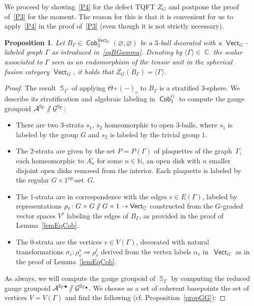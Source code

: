 \documentclass[10pt,a4paper]{amsart}
\DeclareMathOperator{\vect}{\mathsf{Vect}}
\DeclareMathOperator{\C}{\mathbb{C}}
\DeclareMathOperator{\Sp}{\mathbb{S}}
\DeclareMathOperator{\Cob}{\mathsf{Cob}}
\newcommand{\sslash}{\mathbin{/\mkern-6mu/}}
\numberwithin{equation}{section}
\newtheorem{Proposition}[Proposition]{Proposition}
\theoremstyle{definition}
\begin{document}
We proceed by showing~\ref{P4} for the defect TQFT $Z_G$ and postpone the proof of~\ref{P3} for the moment. The reason for this is that it is convenient for us to apply~\ref{P4} in the proof of~\ref{P3} (even though it is not strictly necessary).
\begin{Proposition}
\label{propDW4}
 Let $B_{\Gamma} \in \Cob_3^{\vect_G}(\varnothing, \varnothing)$ be a $3$-ball decorated with a $\vect_G$-labeled graph $\Gamma$ as introduced in~\eqref{eqBGamma}. Denoting by $\langle \Gamma \rangle \in \C$ the scalar associated to $\Gamma$ seen as an endomorphism of the tensor unit in the spherical fusion category $\vect_G$, it holds that $Z_G(B_{\Gamma}) = \langle \Gamma \rangle$.
\end{Proposition}
\begin{proof}
The result $\Sp_{\Gamma}$ of applying $\Theta \circ (-)_c$ to $B_{\Gamma}$ is a stratified 3-sphere. We describe its stratification and algebraic labeling in $\Cob_3^G$ to compute the gauge groupoid $\mathcal{A}^{\mathbb{S}_{\Gamma}} \sslash \mathcal{G}^{\mathbb{S}_{\Gamma}}$:
\begin{itemize}\itemsep=0pt
 \item There are two 3-strata $s_1$, $s_2$ homeomorphic to open 3-balls, where $s_1$ is labeled by the group $G$ and $s_2$ is labeled by the trivial group $1$.
 \item The 2-strata are given by the set $P = P(\Gamma)$ of plaquettes of the graph~$\Gamma$, each homeomorphic to $A_n^{\circ}$ for some $n \in \mathbb{N}$, an open disk with $n$ smaller disjoint open disks removed from the interior. Each plaquette is labeled by the regular $G \times 1^{\mathrm{op}}$-set~$G$.
 \item The 1-strata are in correspondence with the edges $e \in E(\Gamma)$, labeled by representations $\rho_e\colon G \times G \sslash G \times 1 \rightarrow \vect_{\C}$ constructed from the $G$-graded vector spaces $V^e$ labeling the edges of $B_{\Gamma}$, as provided in the proof of Lemma~\ref{lemEqCob}.
 \item The 0-strata are the vertices $v \in V(\Gamma)$, decorated with natural transformations $\sigma_v\colon \rho_v^s \Rightarrow \rho_v^t$ derived from the vertex labels $\alpha_v$ in~$\vect_G$ as in the proof of Lemma~\ref{lemEqCob}.
\end{itemize}
As always, we will compute the gauge groupoid of $\Sp_{\Gamma}$ by computing the reduced gauge groupoid $\mathcal{A}^{\mathbb{S}_{\Gamma} \bullet} \sslash \mathcal{G}^{\mathbb{S}_{\Gamma \bullet}}$. We choose as a set of coherent basepoints the set of vertices $V = V(\Gamma)$ and find the following (cf. Proposition~\ref{propGG}):

\end{proof}
\end{document}
